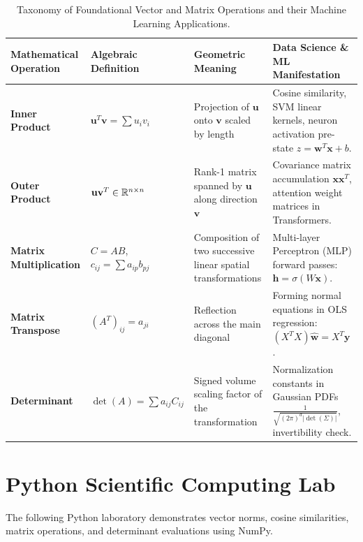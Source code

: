 \begin{table}[htbp]
\centering
\small
\begin{tabular}{p{2.6cm} p{3.2cm} p{3.8cm} p{4.2cm}}
\toprule
\textbf{Mathematical Operation} & \textbf{Algebraic Definition} & \textbf{Geometric Meaning} & \textbf{Data Science \& ML Manifestation} \\
\midrule
\textbf{Inner Product} & $\mathbf{u}^T \mathbf{v} = \sum u_i v_i$ & Projection of $\mathbf{u}$ onto $\mathbf{v}$ scaled by length & Cosine similarity, SVM linear kernels, neuron activation pre-state $z = \mathbf{w}^T \mathbf{x} + b$. \\
\addlinespace
\textbf{Outer Product} & $\mathbf{u} \mathbf{v}^T \in \mathbb{R}^{n \times n}$ & Rank-1 matrix spanned by $\mathbf{u}$ along direction $\mathbf{v}$ & Covariance matrix accumulation $\mathbf{x} \mathbf{x}^T$, attention weight matrices in Transformers. \\
\addlinespace
\textbf{Matrix Multiplication} & $C = AB$, $c_{ij} = \sum a_{ip} b_{pj}$ & Composition of two successive linear spatial transformations & Multi-layer Perceptron (MLP) forward passes: $\mathbf{h} = \sigma(W \mathbf{x})$. \\
\addlinespace
\textbf{Matrix Transpose} & $(A^T)_{ij} = a_{ji}$ & Reflection across the main diagonal & Forming normal equations in OLS regression: $(X^T X) \hat{\mathbf{w}} = X^T \mathbf{y}$. \\
\addlinespace
\textbf{Determinant} & $\det(A) = \sum a_{ij} C_{ij}$ & Signed volume scaling factor of the transformation & Normalization constants in Gaussian PDFs $\frac{1}{\sqrt{(2\pi)^d |\det(\Sigma)|}}$, invertibility check. \\
\bottomrule
\end{tabular}
\caption{Taxonomy of Foundational Vector and Matrix Operations and their Machine Learning Applications.}
\end{table}

\section{Python Scientific Computing Lab}

The following Python laboratory demonstrates vector norms, cosine similarities, matrix operations, and determinant evaluations using NumPy.

